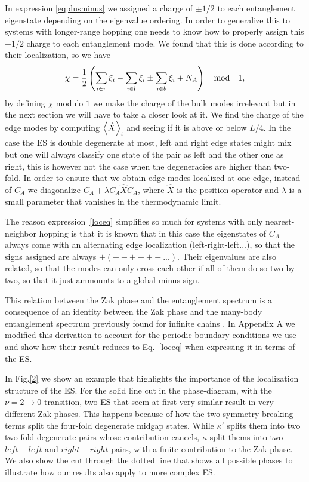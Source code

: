 \documentclass[twocolumn,amsmath,longbibliography,amssymb,superscriptaddress]{revtex4-1}
\begin{document}
In expression 	\eqref{eqplusminus} we assigned a charge of $\pm1/2$ to each entanglement eigenstate depending on the eigenvalue ordering. 
In order to generalize this to systems with longer-range hopping one needs to know how to properly assign this $\pm 1/2$ charge to each entanglement mode. We found that this is done according to their localization, so we have
\begin{equation}
\chi = \frac{1}{2} \left( \sum_{i\in r}\xi_i-\sum_{i\in l}\xi_i \pm \sum_{i\in b}\xi_i  + N_A \right) \quad {\rm mod} \quad 1,
\label{loceq}
\end{equation}
by defining $ \chi$ modulo $1$ we make the charge of the bulk modes irrelevant but in the next section we will have to take a closer look at it. We find the charge of the edge modes by computing $\expval{\hat{X}}_i$ and seeing if it is above or below $L/4$. In the case the ES is double degenerate at most, left and right edge states might mix but one will always classify one state of the pair as left and the other one as right, this is however not the case when the degeneracies are higher than two-fold. In order to ensure that we obtain edge modes localized at one edge, instead of $C_A$ we diagonalize $C_A + \lambda C_A\hat{X}C_A$, where $\hat{X}$ is the position operator and $\lambda$ is a small parameter that vanishes in the thermodynamic limit. 

The reason expression~\eqref{loceq} simplifies so much for systems with only nearest-neighbor hopping is that it is known that in this case the eigenstates of $C_A$ always come with an alternating edge localization (left-right-left...), so that the signs assigned are always $ \pm(+-+-+-...)$. Their eigenvalues are also related, so that the modes can only cross each other if all of them do so two by two, so that it just ammounts to a global minus sign.

This relation between the Zak phase and the entanglement spectrum is a consequence of an identity between the Zak phase and the many-body entanglement spectrum previously found for infinite chains \cite{Zaletel2014}. In Appendix A we modified this derivation to account for the periodic boundary conditions we use and show how their result reduces to Eq.~\eqref{loceq} when expressing it in terms of the ES.

In Fig.\ref{2} we show an example that highlights the importance of the localization structure of the ES. For the solid line cut in the phase-diagram, with the $\nu = 2 \rightarrow 0 $ transition, two ES that seem at first very similar result in very different Zak phases. This happens because of how the two symmetry breaking terms split the four-fold degenerate midgap states. While $\kappa'$ splits them into two two-fold degenerate pairs whose contribution cancels, $\kappa$ split thems into two $left-left$ and $right-right$ pairs, with a finite contribution to the Zak phase. We also show the cut through the dotted line that shows all possible phases to illustrate how our results also apply to more complex ES. 
\end{document}
